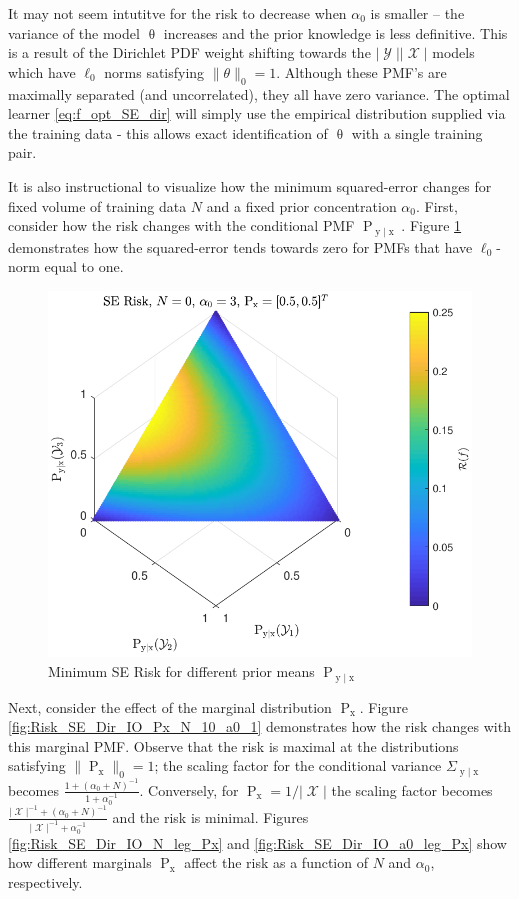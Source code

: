\documentclass[12pt]{report}
\DeclareMathOperator{\xrm}{\mathrm{x}}
\DeclareMathOperator{\yrm}{\mathrm{y}}
\DeclareMathOperator{\Prm}{\mathrm{P}}
\DeclareMathOperator{\Xcal}{\mathcal{X}}
\DeclareMathOperator{\Ycal}{\mathcal{Y}}
\begin{document}
It may not seem intutitve for the risk to decrease when $\alpha_0$ is smaller -- the variance of the model $\uptheta$ increases and the prior knowledge is less definitive. This is a result of the Dirichlet PDF weight shifting towards the $|\Ycal||\Xcal|$ models which have $\ell_0$ norms satisfying $\| \theta \|_0 = 1$. Although these PMF's are maximally separated (and uncorrelated), they all have zero variance. The optimal learner \eqref{eq:f_opt_SE_dir} will simply use the empirical distribution supplied via the training data - this allows exact identification of $\uptheta$ with a single training pair.

It is also instructional to visualize how the minimum squared-error changes for fixed volume of training data $N$ and a fixed prior concentration $\alpha_0$. First, consider how the risk changes with the conditional PMF $\Prm_{\yrm | \xrm}$. Figure \ref{fig:Risk_SE_Dir_IO_Pyx} demonstrates how the squared-error tends towards zero for PMFs that have $\ell_0$-norm equal to one.
\begin{figure}
\centering
\includegraphics[width=0.7\linewidth]{Risk_SE_Dir_IO_Pyx.pdf}
\caption{Minimum SE Risk for different prior means $\Prm_{\yrm | \xrm}$}
\label{fig:Risk_SE_Dir_IO_Pyx}
\end{figure}

Next, consider the effect of the marginal distribution $\Prm_{\xrm}$. Figure \ref{fig:Risk_SE_Dir_IO_Px_N_10_a0_1} demonstrates how the risk changes with this marginal PMF. Observe that the risk is maximal at the distributions satisfying $\| \Prm_{\xrm} \|_0 = 1$; the scaling factor for the conditional variance $\Sigma_{\yrm | \xrm}$ becomes $\frac{1 + (\alpha_0+N)^{-1}}{1 + \alpha_0^{-1}}$. Conversely, for $\Prm_{\xrm} = 1/|\Xcal|$ the scaling factor becomes $\frac{|\Xcal|^{-1} + (\alpha_0+N)^{-1}}{|\Xcal|^{-1} + \alpha_0^{-1}}$ and the risk is minimal. Figures \ref{fig:Risk_SE_Dir_IO_N_leg_Px} and \ref{fig:Risk_SE_Dir_IO_a0_leg_Px} show how different marginals $\Prm_{\xrm}$ affect the risk as a function of $N$ and $\alpha_0$, respectively.
\end{document}

